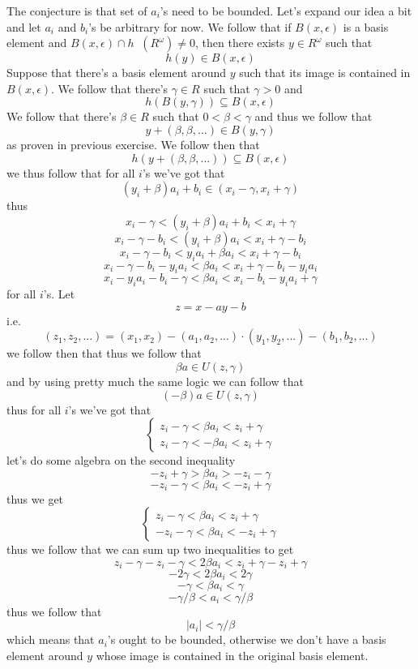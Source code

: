 \documentclass[11pt,oneside,titlepage]{book}
\DeclareMathOperator \inv {^{-1}}
\begin{document}
The conjecture is that set of $a_i$'s need to be bounded.
Let's expand our idea a bit and let $a_i$ and $b_i$'s be arbitrary for now.
We follow that if $B(x, \epsilon)$ is a basis element and
$B(x, \epsilon) \cap h\inv(R^\omega) \neq 0$, then there exists $y \in R^\omega$ such that
$$h(y) \in B(x, \epsilon)$$
Suppose that there's a basis element around $y$ such that its image is contained in
$B(x, \epsilon)$. We follow that there's  $\gamma \in R$  such that $\gamma > 0$ and 
$$h(B(y, \gamma)) \subseteq B(x, \epsilon)$$
We follow that there's $\beta \in R$ such that $0 < \beta < \gamma$ and thus we follow that
$$y + (\beta, \beta, ...) \in B(y, \gamma)$$
as proven in previous exercise. We follow then that
$$h(y + (\beta, \beta, ...)) \subseteq B(x, \epsilon)$$
we thus follow that for all $i$'s we've got that
$$(y_i + \beta) a_i + b_i \in (x_i - \gamma, x_i + \gamma)$$
thus
$$x_i - \gamma < (y_i + \beta) a_i + b_i < x_i + \gamma$$
$$x_i - \gamma - b_i < (y_i + \beta) a_i  < x_i + \gamma - b_i$$
$$x_i - \gamma - b_i < y_i a_i + \beta a_i  < x_i + \gamma - b_i$$
$$x_i - \gamma - b_i - y_i a_i <  \beta a_i  < x_i + \gamma - b_i - y_i a_i$$
$$x_i - y_i a_i - b_i - \gamma   <  \beta a_i  < x_i - b_i - y_i a_i + \gamma $$
for all $i$'s.
Let
$$z = x - ay - b$$
i.e.
$$(z_1, z_2, ...) = (x_1, x_2) - (a_1, a_2, ...) \cdot (y_1, y_2, ...) - (b_1, b_2, ...)$$
we follow then that
thus we follow that
$$\beta a \in U(z, \gamma)$$
and by using pretty much the same logic we can follow that 
$$(-\beta) a \in U(z, \gamma)$$
thus for all $i$'s we've got that
$$
\begin{cases}
  z_i - \gamma < \beta a_i < z_i + \gamma \\
  z_i - \gamma < -\beta a_i < z_i + \gamma
\end{cases}
$$
let's do some algebra on the second inequality
$$- z_i + \gamma > \beta a_i > - z_i - \gamma$$
$$- z_i - \gamma < \beta a_i < - z_i + \gamma$$
thus we get
$$
\begin{cases}
  z_i - \gamma < \beta a_i < z_i + \gamma \\
  - z_i - \gamma < \beta a_i < - z_i + \gamma
\end{cases}
$$
thus we follow that we can sum up two inequalities to get
$$z_i - \gamma - z_i - \gamma < 2 \beta a_i < z_i + \gamma - z_i  + \gamma$$
$$ - 2\gamma < 2 \beta a_i <  2 \gamma $$
$$ - \gamma < \beta a_i < \gamma $$
$$ - \gamma / \beta <  a_i < \gamma / \beta $$
thus we follow that
$$|a_i| < \gamma / \beta$$
which means that $a_i$'s ought to be bounded, otherwise we don't have a basis element
around $y$ whose image is contained in the original basis element.
\end{document}
